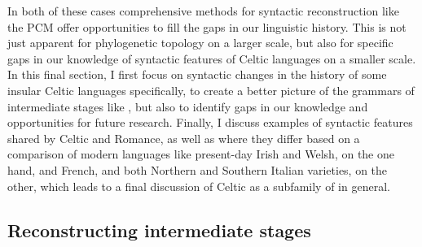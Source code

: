 \documentclass[output=paper,colorlinks,citecolor=brown]{langscibook}
\begin{document}
In both of these cases comprehensive methods for syntactic reconstruction like the PCM offer opportunities to fill the gaps in our linguistic history. This is not just apparent for phylogenetic topology on a larger scale, but also for specific gaps in our knowledge of syntactic features of Celtic languages on a smaller scale. In this final section, I first focus on syntactic changes in the history of some insular Celtic languages specifically, to create a better picture of the grammars of intermediate stages like , but also to identify gaps in our knowledge and opportunities for future research. Finally, I  discuss examples of syntactic features shared by Celtic and Romance, as well as where they differ based on a comparison of modern languages like present-day Irish and Welsh, on the one hand, and French,  and both Northern and Southern Italian varieties, on the other, which leads to a final discussion of Celtic as a subfamily of  in general.

\subsection{Reconstructing intermediate stages}
\label{sec:PCMforhistcelt}
\end{document}
